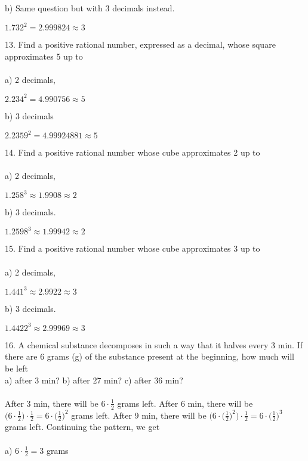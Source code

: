 \documentclass[12pt]{article}
\begin{document}
b) Same question but with 3 decimals instead.
\begin{center}
$1.732^2=2.999824\approx3$
\end{center}
13. Find a positive rational number, expressed as a decimal, whose square approximates 5 up to \\
\\
a) 2 decimals,
\begin{center}
$2.234^2=4.990756\approx5$
\end{center}
b) 3 decimals
\begin{center}
$2.2359^2=4.99924881\approx5$
\end{center}
14. Find a positive rational number whose cube approximates 2 up to \\
\\
a) 2 decimals,
\begin{center}
$1.258^3\approx1.9908\approx2$
\end{center}
b) 3 decimals.
\begin{center}
$1.2598^3\approx1.99942\approx2$
\end{center}
15. Find a positive rational number whose cube approximates 3 up to \\
\\
a) 2 decimals,
\begin{center}
$1.441^3\approx2.9922\approx3$
\end{center}
b) 3 decimals.
\begin{center}
$1.4422^3\approx2.99969\approx3$
\end{center}
16. A chemical substance decomposes in such a way that it halves every 3 min. If there are 6 grams (g) of the substance present at the beginning, how much will be left \\
a) after 3 min? \hfill b) after 27 min? \hfill c) after 36 min? \\
\\
After 3 min, there will be $6\cdot \displaystyle \frac{1}{2}$ grams left. After 6 min, there will be $\bigg(6\cdot \displaystyle \frac{1}{2}\bigg)\cdot \displaystyle \frac{1}{2}=6\cdot \bigg(\displaystyle \frac{1}{2}\bigg)^2$ grams left. After 9 min, there will be $\bigg(6\cdot \bigg(\displaystyle \frac{1}{2}\bigg)^2\bigg)\cdot \displaystyle \frac{1}{2}=6\cdot \bigg(\displaystyle \frac{1}{2}\bigg)^3$ grams left. Continuing the pattern, we get \\
\\
a) $6\cdot \displaystyle \frac{1}{2}=3$ grams \\
\\
\end{document}
